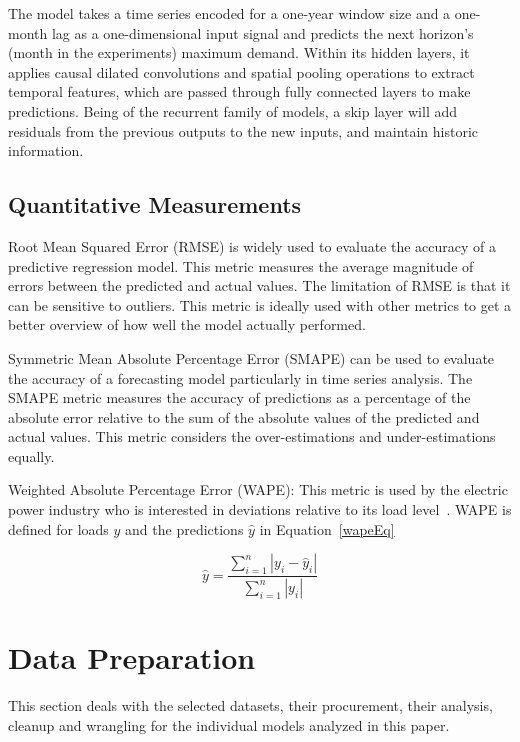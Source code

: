 \documentclass{ieeeaccess}
\begin{document}
The model takes a time series encoded for a one-year window size and a one-month lag as a one-dimensional input signal and predicts the next horizon's (month in the experiments) maximum demand. Within its hidden layers, it applies causal dilated convolutions and spatial pooling operations to extract temporal features, which are passed through fully connected layers to make predictions. Being of the recurrent family of models, a skip layer will add residuals from the previous outputs to the new inputs, and maintain historic information.

\subsection{Quantitative Measurements}

Root Mean Squared Error (RMSE) is widely used to evaluate the accuracy of a predictive regression model. This metric measures the average magnitude of errors between the predicted and actual values. The limitation of RMSE is that it can be sensitive to outliers. This metric is ideally used with other metrics to get a better overview of how well the model actually performed.

Symmetric Mean Absolute Percentage Error (SMAPE) can be used to evaluate the accuracy of a forecasting model particularly in time series analysis. The SMAPE metric measures the accuracy of predictions as a percentage of the absolute error relative to the sum of the absolute values of the predicted and actual values. This metric considers the over-estimations and under-estimations equally.

Weighted Absolute Percentage Error (WAPE): This metric is used by the electric power industry who is interested in deviations relative to its load level~\cite{Benitez2020}. WAPE is defined for loads $y$ and the predictions $\hat{y}$ in Equation~\ref{wapeEq}

\begin{equation}
 \label{wapeEq}
     \hat{y}= \frac{\sum_{i=1}^{n} |y_i - \hat{y}_i|}{\sum_{i=1}^{n} |y_i|}
\end{equation}


\section{Data Preparation}
\label{sec:data}
This section deals with the selected datasets, their procurement, their analysis, cleanup and wrangling for the individual models analyzed in this paper.
\end{document}

